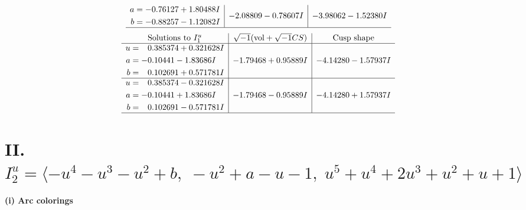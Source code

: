 \documentclass[1p]{elsarticle_modified}
\theoremstyle{definition}
\newcommand{\I}{\sqrt{-1}}
\begin{document}
$$\begin{array}{c|c|c}
\begin{aligned}
a &= -0.76127 + 1.80488 I \\
b &= -0.88257 - 1.12082 I\end{aligned}
 & -2.08809 - 0.78607 I & -3.98062 - 1.52380 I\\
 \hline 
 \end{array}$$\newpage$$\begin{array}{c|c|c}  
\text{Solutions to }I^u_{1}& \I (\text{vol} + \sqrt{-1}CS) & \text{Cusp shape}\\
 \hline 
\begin{aligned}
u &= \phantom{-}0.385374 + 0.321628 I \\
a &= -0.10441 - 1.83686 I \\
b &= \phantom{-}0.102691 + 0.571781 I\end{aligned}
 & -1.79468 + 0.95889 I & -4.14280 - 1.57937 I \\ \hline\begin{aligned}
u &= \phantom{-}0.385374 - 0.321628 I \\
a &= -0.10441 + 1.83686 I \\
b &= \phantom{-}0.102691 - 0.571781 I\end{aligned}
 & -1.79468 - 0.95889 I & -4.14280 + 1.57937 I\\
 \hline 
 \end{array}$$\newpage\newpage\renewcommand{\arraystretch}{1}
\centering \section*{II. $I^u_{2}= \langle - u^4- u^3- u^2+b,\;- u^2+a- u-1,\;u^5+u^4+2 u^3+u^2+u+1 \rangle$}
\flushleft \textbf{(i) Arc colorings}\\
\end{document}
